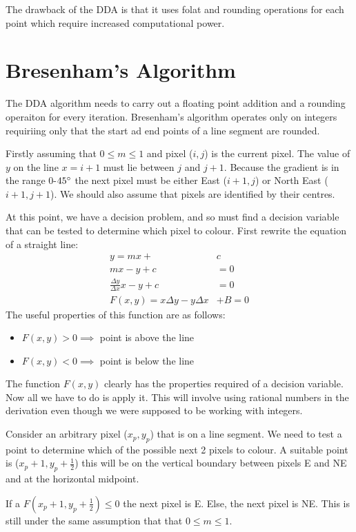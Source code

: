 \documentclass{article}
\begin{document}
The drawback of the DDA is that it uses folat and rounding operations for each point which require increased computational power.

\section{Bresenham's Algorithm}
The DDA algorithm needs to carry out a floating point addition and a rounding operaiton for every iteration.
Bresenham's algorithm operates only on integers requiriing only that the start ad end points of a line segment are rounded.

Firstly assuming that $0\le m \le 1$ and pixel ($i,j$) is the current pixel.
The value of $y$ on the line $x=i+1$ must lie between $j$ and $j+1$.
Because the gradient is in the range 0-$45\degree$ the next pixel must be either East ($i+1,j$) or North East ($i+1,j+1$).
We should also assume that pixels are identified by their centres.

At this point, we have a decision problem, and so must find a decision variable that can be tested to determine which pixel to colour.
First rewrite the equation of a straight line:
\begin{align*}
	y = mx + &c \\
	mx - y + c &= 0 \\
	\frac{\Delta y}{\Delta x} x - y + c &= 0 \\
	F(x,y) = x \Delta y - y\Delta x &+ B = 0
\end{align*}
The useful properties of this function are as follows:
\begin{itemize}
	\item $F(x,y)>0 \implies$ point is above the line
	\item $F(x,y)<0 \implies$ point is below the line
\end{itemize}

The function $F(x,y)$ clearly has the properties required of a decision variable.
Now all we have to do is apply it.
This will involve using rational numbers in the derivation even though we were supposed to be working with integers.

Consider an arbitrary pixel ($x_p,y_p$) that is on a line segment.
We need to test a point to determine which of the possible next 2 pixels to colour.
A suitable point is ($x_p+1,y_p+\frac{1}{2}$) this will be on the vertical boundary between pixels E and NE and at the horizontal midpoint.

\smallskip
If a $F(x_p+1,y_p + \frac{1}{2}) \le 0$ the next pixel is E.
Else, the next pixel is NE.
This is still under the same assumption that that $0\le m\le1$.
\end{document}
